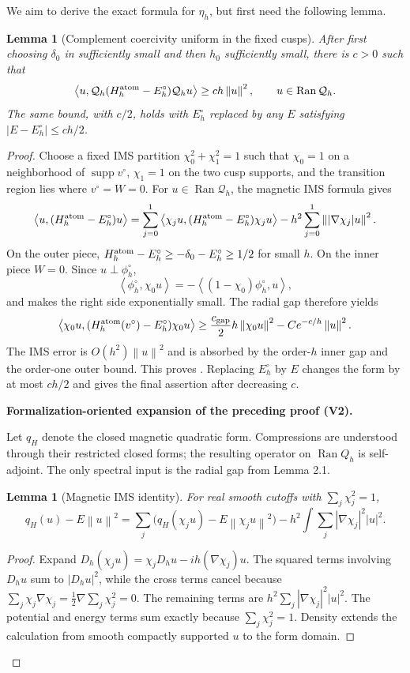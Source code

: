\documentclass[11pt]{article}
\newtheorem{lemma}[theorem]{Lemma}
\newcommand{\formalisationparentid}{X}
\newenvironment{formalisationaddition}[1]{\par\medskip\begingroup\color{blue}\def\formalisationparentid{#1}\setcounter{formalizationsublemma}{0}\let\lemma\formalizationsublemma\let\endlemma\endformalizationsublemma
  \def\Eo{\mathcal E_h^\circ}\def\EE{\mathcal E_h}\def\phio{\phi_h^\circ}\def\phih{\phi_h}\def\Ho{H_h^{\rm atom}(v^\circ)}\def\Ha{H_h^{\rm atom}}\def\HL{H_h^{L}}\def\Dh{D_h}\def\Log{\operatorname{Log}}\def\ellh{\ell_h}\def\Gp{G_{p,h}}\def\Ast{A_{*,h}}\def\ahat{\widehat{\mathfrak a}_h}\def\ah{\mathfrak a_h}\def\rh{\widehat\rho_h}\def\deltah{\widehat\delta_h}\def\oldref##1{\textup{(##1)}}\def\interface##1{\par\noindent\textit{Analytical interface used here.} ##1\par}\def\finish{\par\noindent\textit{Conclusion of the formalization-oriented expansion.} }\par\noindent\textbf{Formalization-oriented expansion of the preceding proof (V2).}\par\smallskip
}{\par\endgroup\medskip
}
\newcommand{\cQ}{\mathcal Q}
\newcommand{\norm}[1]{\left\|#1\right\|}
\newcommand{\ip}[2]{\left\langle #1,#2\right\rangle}
\newcommand{\supp}{\operatorname{supp}}
\newcommand{\Ran}{\operatorname{Ran}}
\begin{document}
We aim to derive the exact formula for $\eta_h$, but first need the following lemma. 

\begin{lemma}[Complement coercivity uniform in the fixed cusps]\label{lem:complement-coercivity}
After first choosing $\delta_0$ in  sufficiently small and then $h_0$ sufficiently small, there is $c>0$ such that
\begin{equation}\label{eq:compressed-gap}
 \ip{u}{\cQ_h(H_h^{\rm atom}-E_h^\circ)\cQ_hu}
 \ge ch\norm{u}^2,
 \qquad u\in\Ran\cQ_h.
\end{equation}
The same bound, with $c/2$, holds with $E_h^\circ$ replaced by any $E$ satisfying $|E-E_h^\circ|\le ch/2$.
\end{lemma}

\begin{proof}
Choose a fixed IMS partition $\chi_0^2+\chi_1^2=1$ such that $\chi_0=1$ 
on a neighborhood of $\supp v^\circ$, $\chi_1=1$ on the two cusp
supports, and the transition region lies where $v^\circ=W=0$.  For
$u\in\Ran\cQ_h$, the magnetic IMS formula gives
\[
 \ip{u}{(H_h^{\rm atom}-E_h^\circ)u}
 =\sum_{j=0}^1\ip{\chi_ju}{(H_h^{\rm atom}-E_h^\circ)\chi_ju}
 -h^2\sum_{j=0}^1\norm{|\nabla\chi_j|u}^2.
\]
On the outer piece,
$H_h^{\rm atom}-E_h^\circ\ge-\delta_0-E_h^\circ\ge1/2$ for small $h$.  On the inner
piece $W=0$.  Since $u\perp\phi_h^\circ$,
\[
 \ip{\phi_h^\circ}{\chi_0u}
 =-\ip{(1-\chi_0)\phi_h^\circ}{u},
\]
and  makes the right side exponentially small.
The radial gap  therefore yields
\[
 \ip{\chi_0u}{(H_h^{\rm atom}(v^\circ)-E_h^\circ)\chi_0u}
 \ge \frac{c_{\rm gap}}2h\norm{\chi_0u}^2
 -Ce^{-c/h}\norm u^2.
\]
The IMS error is $O(h^2)\norm u^2$ and is absorbed by the order-$h$ inner
gap and the order-one outer bound.  This proves .
Replacing $E_h^\circ$ by $E$ changes the form by at most $ch/2$ and gives
the final assertion after decreasing $c$.

\begin{formalisationaddition}{L3.1}
Let $q_H$ denote the closed magnetic quadratic form. Compressions are understood through their restricted closed forms; the resulting operator on $\Ran Q_h$ is self-adjoint. The only spectral input is the radial gap from Lemma 2.1.

\begin{lemma}[Magnetic IMS identity]\label{sublemma:L3-1-ims}
For real smooth cutoffs with $\sum_j\chi_j^2=1$,
\[
 q_H(u)-E\norm u^2
 =\sum_j\big(q_H(\chi_ju)-E\norm{\chi_ju}^2\big)
       -h^2\int\sum_j|\nabla\chi_j|^2|u|^2.
\]
\end{lemma}
\begin{proof}
Expand $D_h(\chi_ju)=\chi_jD_hu-ih(\nabla\chi_j)u$. The squared terms involving $D_hu$ sum to $|D_hu|^2$, while the cross terms cancel because $\sum_j\chi_j\nabla\chi_j=\frac12\nabla\sum_j\chi_j^2=0$. The remaining terms are $h^2\sum_j|\nabla\chi_j|^2|u|^2$. The potential and energy terms sum exactly because $\sum_j\chi_j^2=1$. Density extends the calculation from smooth compactly supported $u$ to the form domain.
\end{proof}


\end{formalisationaddition}
\end{proof}
\end{document}
